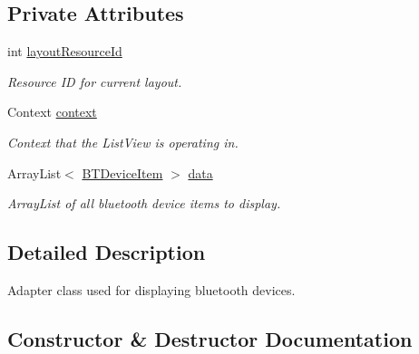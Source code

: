 \subsection*{Private Attributes}
\begin{DoxyCompactItemize}
\item 
\mbox{\label{class_android_app_1_1_b_t_device_list_adapter_ae0c8b1482e416a5b242dcec87b83f661}} 
int \hyperlink{class_android_app_1_1_b_t_device_list_adapter_ae0c8b1482e416a5b242dcec87b83f661}{layout\+Resource\+Id}
\begin{DoxyCompactList}\small\item\em Resource ID for current layout. \end{DoxyCompactList}\item 
\mbox{\label{class_android_app_1_1_b_t_device_list_adapter_a6ede6626d5bc086d094f35071f8d59c8}} 
Context \hyperlink{class_android_app_1_1_b_t_device_list_adapter_a6ede6626d5bc086d094f35071f8d59c8}{context}
\begin{DoxyCompactList}\small\item\em Context that the List\+View is operating in. \end{DoxyCompactList}\item 
\mbox{\label{class_android_app_1_1_b_t_device_list_adapter_a210dbb300083d9029aa960841c8aa505}} 
Array\+List$<$ \hyperlink{class_android_app_1_1_b_t_device_item}{B\+T\+Device\+Item} $>$ \hyperlink{class_android_app_1_1_b_t_device_list_adapter_a210dbb300083d9029aa960841c8aa505}{data}
\begin{DoxyCompactList}\small\item\em Array\+List of all bluetooth device items to display. \end{DoxyCompactList}\end{DoxyCompactItemize}


\subsection{Detailed Description}
Adapter class used for displaying bluetooth devices. 

\subsection{Constructor \& Destructor Documentation}
\mbox{\label{class_android_app_1_1_b_t_device_list_adapter_a6d4d0dc1f894bbb2378a71eea4907bb0}} 
